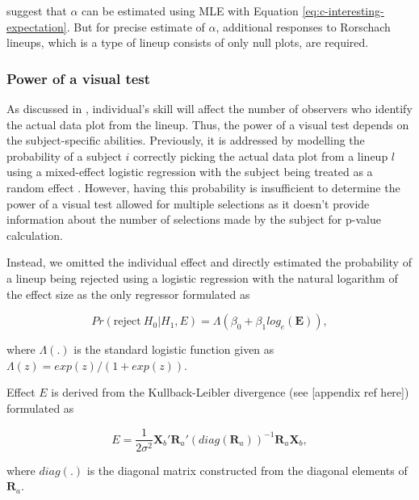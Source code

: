 \documentclass[]{interact}
\theoremstyle{plain}%
\theoremstyle{definition}
\theoremstyle{remark}
\begin{document}
\citet{vanderplas2021statistical} suggest that \(\alpha\) can be
estimated using MLE with Equation \ref{eq:c-interesting-expectation}.
But for precise estimate of \(\alpha\), additional responses to
Rorschach lineups, which is a type of lineup consists of only null
plots, are required.

\hypertarget{power-of-a-visual-test}{%
\subsubsection{Power of a visual test}\label{power-of-a-visual-test}}

As discussed in \citet{majumder_validation_2013}, individual's skill
will affect the number of observers who identify the actual data plot
from the lineup. Thus, the power of a visual test depends on the
subject-specific abilities. Previously, it is addressed by modelling the
probability of a subject \(i\) correctly picking the actual data plot
from a lineup \(l\) using a mixed-effect logistic regression with the
subject being treated as a random effect
\citep{majumder_validation_2013}. However, having this probability is
insufficient to determine the power of a visual test allowed for
multiple selections as it doesn't provide information about the number
of selections made by the subject for p-value calculation.

Instead, we omitted the individual effect and directly estimated the
probability of a lineup being rejected using a logistic regression with
the natural logarithm of the effect size as the only regressor
formulated as

\begin{equation} \label{eq:logistic-regression-1-1}
Pr(\text{reject}~H_0|H_1,E) = \Lambda(\beta_0 + \beta_1 log_e(\boldsymbol{E})),
\end{equation}

\noindent where \(\Lambda(.)\) is the standard logistic function given
as \(\Lambda(z) = exp(z)/(1+exp(z))\).

Effect \(E\) is derived from the Kullback-Leibler divergence (see
{[}appendix ref here{]}) formulated as

\begin{equation} \label{eq:effect-size-ex1}
E = \frac{1}{2\sigma^2}\boldsymbol{X}_b'\boldsymbol{R}_a'(diag(\boldsymbol{R}_a))^{-1}\boldsymbol{R}_a\boldsymbol{X}_b,
\end{equation}

\noindent where \(diag(.)\) is the diagonal matrix constructed from the
diagonal elements of \(\boldsymbol{R}_a\).
\end{document}
